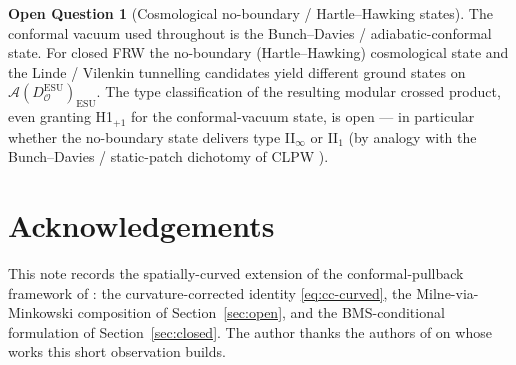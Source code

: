 \documentclass[11pt]{article}
\theoremstyle{definition}
\newtheorem{question}[theorem]{Open Question}
\renewcommand{\AA}{\mathcal{A}}
\newcommand{\OO}{\mathcal{O}}
\newcommand{\ESU}{\mathrm{ESU}}
\begin{document}
\begin{question}[Cosmological no-boundary / Hartle--Hawking states]\label{q:nb}
The conformal vacuum used throughout is the Bunch--Davies /
adiabatic-conformal state. For closed FRW the no-boundary
(Hartle--Hawking) cosmological state and the Linde / Vilenkin tunnelling
candidates yield different ground states on $\AA(D_\OO^\ESU)_\ESU$. The
type classification of the resulting modular crossed product, even
granting H1$_{+1}$ for the conformal-vacuum state, is open --- in
particular whether the no-boundary state delivers type II$_\infty$ or
II$_1$ (by analogy with the Bunch--Davies / static-patch dichotomy of CLPW
\cite{CLPW2023}).
\end{question}

\section*{Acknowledgements}

This note records the spatially-curved extension of the conformal-pullback
framework of \cite{Remondiere2026}: the curvature-corrected identity
\eqref{eq:cc-curved}, the Milne-via-Minkowski composition of
Section~\ref{sec:open}, and the BMS-conditional formulation of
Section~\ref{sec:closed}. The author thanks the authors of \cite{BMS2000,
HislopLongo1982, BGL1993, Wald1984, Wald1994, HollandsWald2001, Verch1997,
Frob2023, Connes1973, Dimock1980, LudersRoberts1990} on whose works this
short observation builds.



\end{document}
